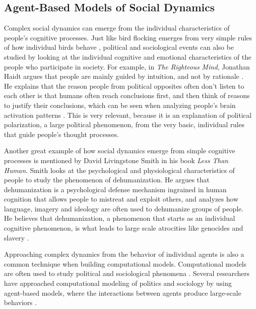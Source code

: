 \documentclass[11pt]{article}
\begin{document}
\subsection{Agent-Based Models of Social Dynamics}

Complex social dynamics can emerge from the individual characteristics of people's cognitive processes. Just like bird flocking emerges from very simple rules of how individual birds behave \cite{christodoulidi2015phase}, political and sociological events can also be studied by looking at the individual cognitive and emotional characteristics of the people who participate in society. For example, in \textit{The Righteous Mind}, Jonathan Haidt argues that people are mainly guided by intuition, and not by rationale \cite{haidt2012righteous}. He explains that the reason people from political opposites often don’t listen to each other is that humans often reach conclusions first, and then think of reasons to justify their conclusions, which can be seen when analyzing people’s brain activation patterns \cite{saletan2012why}. This is very relevant, because it is an explanation of political polarization, a large political phenomenon, from the very basic, individual rules that guide people’s thought processes.

Another great example of how social dynamics emerge from simple cognitive processes is mentioned by David Livingstone Smith in his book \textit{Less Than Human}. Smith looks at the psychological and physiological characteristics of people to study the phenomenon of dehumanization. He argues that dehumanization is a psychological defense mechanism ingrained in human cognition that allows people to mistreat and exploit others, and analyzes how language, imagery and ideology are often used to dehumanize groups of people. He believes that dehumanization, a phenomenon that starts as an individual cognitive phenomenon, is what leads to large scale atrocities like genocides and slavery \cite{smith2011less}. 

Approaching complex dynamics from the behavior of individual agents is also a common technique when building computational models. Computational models are often used to study political and sociological phenomena \cite{cederman2005computational, kim2020computational, scott2003computational}. Several researchers have approached computational modeling of politics and sociology by using agent-based models, where the interactions between agents produce large-scale behaviors \cite{bianchi2015agent, bruch2015agent}.
\end{document}
